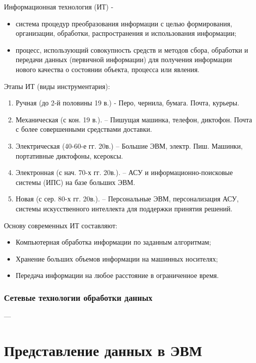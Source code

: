 \documentclass[a4paper]{article}
\begin{document}
  Информационная технология (ИТ) -
  \begin{itemize}
      \item система процедур преобразования информации с целью формирования, организации, обработки, распространения и использования информации;
      \item процесс, использующий совокупность средств и методов сбора, обработки и передачи данных (первичной информации) для получения информации нового качества о состоянии объекта, процесса или явления.
\end{itemize}
Этапы ИТ (виды инструментария):
\begin{enumerate}
  \item Ручная  (до 2-й половины 19 в.) - Перо, чернила, бумага. Почта, курьеры.
  \item Механическая (с кон. 19 в.). – Пишущая машинка, телефон, диктофон. Почта с более совершенными средствами доставки.
  \item Электрическая (40-60-е гг. 20в.) – Большие ЭВМ, электр. Пиш. Машинки, портативные диктофоны, ксероксы.
  \item  Электронная (с нач. 70-х гг. 20в.). – АСУ и информационно-поисковые системы (ИПС) на базе больших ЭВМ.
  \item Новая (с сер. 80-х гг. 20в.).  – Персональные ЭВМ, персонализация АСУ, системы искусственного интеллекта для поддержки принятия решений.
\end{enumerate}

Основу современных ИТ составляют:
\begin{itemize}
  \item Компьютерная обработка информации по заданным алгоритмам;
  \item Хранение больших объемов информации на машинных носителях;
  \item Передача информации на любое расстояние в ограниченное время.
\end{itemize}

\subsubsection{Сетевые технологии обработки данных}

---

\section{Представление данных в ЭВМ}
\end{document}
